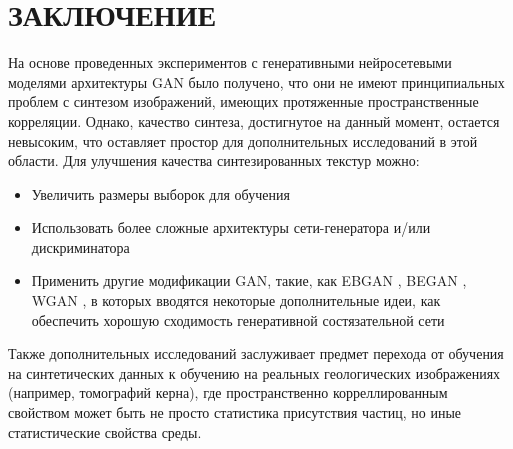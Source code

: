 \clearpage
\section*{\hfil ЗАКЛЮЧЕНИЕ \hfil}
	На основе проведенных экспериментов с генеративными нейросетевыми моделями архитектуры GAN было получено, что они не имеют принципиальных проблем с синтезом изображений, имеющих протяженные пространственные корреляции. Однако, качество синтеза, достигнутое на данный момент, остается невысоким, что оставляет простор для дополнительных исследований в этой области. Для улучшения качества синтезированных текстур можно:
	
	\begin{itemize}
		\item Увеличить размеры выборок для обучения
		\item Использовать более сложные архитектуры сети-генератора и/или дискриминатора
		\item Применить другие модификации GAN, такие, как EBGAN \cite{EBGAN}, BEGAN \cite{BEGAN}, WGAN \cite{wgan}, в которых вводятся некоторые дополнительные идеи, как обеспечить хорошую сходимость генеративной состязательной сети
	\end{itemize}
	
	Также дополнительных исследований заслуживает предмет перехода от обучения на синтетических данных к обучению на реальных геологических изображениях (например, томографий керна), где пространственно корреллированным свойством может быть не просто статистика присутствия частиц, но иные статистические свойства среды.